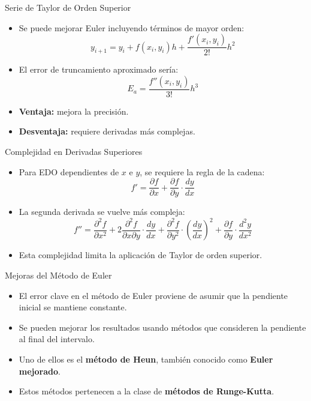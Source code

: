 \documentclass[main.tex]{subfiles}
\begin{document}
\begin{frame}{\small Serie de Taylor de Orden Superior}
\begin{itemize}
  \item Se puede mejorar Euler incluyendo t\'erminos de mayor orden:
  \[
    y_{i+1} = y_i + f(x_i, y_i) h + \frac{f'(x_i, y_i)}{2!} h^2
  \]
  \item El error de truncamiento aproximado ser\'ia:
  \[
    E_a = \frac{f''(x_i, y_i)}{3!} h^3
  \]
  \item \textbf{Ventaja:} mejora la precisi\'on.
  \item \textbf{Desventaja:} requiere derivadas m\'as complejas.
\end{itemize}
\end{frame}

\begin{frame}{\small Complejidad en Derivadas Superiores}
\begin{itemize}
  \item Para EDO dependientes de $x$ e $y$, se requiere la regla de la cadena:
  \[
    f' = \frac{\partial f}{\partial x} + \frac{\partial f}{\partial y} \cdot \frac{dy}{dx}
  \]
  \item La segunda derivada se vuelve m\'as compleja:
  \[
    f'' = \frac{\partial^2 f}{\partial x^2} + 2 \frac{\partial^2 f}{\partial x \partial y} \cdot \frac{dy}{dx} + \frac{\partial^2 f}{\partial y^2} \cdot \left( \frac{dy}{dx} \right)^2 + \frac{\partial f}{\partial y} \cdot \frac{d^2y}{dx^2}
  \]
  \item Esta complejidad limita la aplicaci\'on de Taylor de orden superior.
\end{itemize}
\end{frame}

\begin{frame}{\small Mejoras del M\'etodo de Euler}
\begin{itemize}
  \item El error clave en el m\'etodo de Euler proviene de asumir que la pendiente inicial se mantiene constante.
  \item Se pueden mejorar los resultados usando m\'etodos que consideren la pendiente al final del intervalo.
  \item Uno de ellos es el \textbf{m\'etodo de Heun}, tambi\'en conocido como \textbf{Euler mejorado}.
  \item Estos m\'etodos pertenecen a la clase de \textbf{m\'etodos de Runge-Kutta}.
\end{itemize}
\end{frame}
\end{document}
